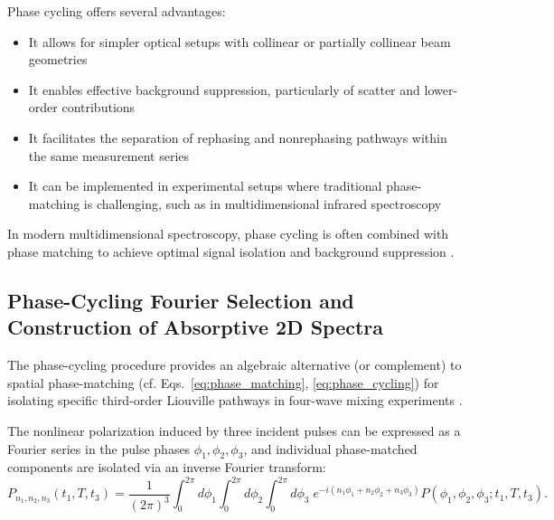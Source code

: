 \noindent Phase cycling offers several advantages:

\begin{itemize}
	\item It allows for simpler optical setups with collinear or partially collinear beam geometries
	\item It enables effective background suppression, particularly of scatter and lower-order contributions
	\item It facilitates the separation of rephasing and nonrephasing pathways within the same measurement series
	\item It can be implemented in experimental setups where traditional phase-matching is challenging, such as in multidimensional infrared spectroscopy
\end{itemize}

\noindent In modern multidimensional spectroscopy, phase cycling is often combined with phase matching to achieve optimal signal isolation and background suppression \cite{huang-fuetal2024developmentphasecyclinginterfacespecific, tianetal2003femtosecondphasecoherenttwodimensional}.

\subsection{Phase-Cycling Fourier Selection and Construction of Absorptive 2D Spectra}
\label{subsec:phase_cycling_fourier_selection}

\noindent The phase-cycling procedure provides an algebraic alternative (or complement) to spatial phase-matching (cf. Eqs.~\eqref{eq:phase_matching}, \eqref{eq:phase_cycling}) for isolating specific third-order Liouville pathways in four-wave mixing experiments \cite{mukamel1995principlesnonlinearoptical, cho2009twodimensionalopticalspectroscopy, jonas2003twodimensionalfemtosecondspectroscopy, brixneretal2004phasestabilizedtwodimensionalelectronic, greenetal2024vibrationalcoherenceshalfbroadband}.

\noindent The nonlinear polarization induced by three incident pulses can be expressed as a Fourier series in the pulse phases $\phi_1, \phi_2, \phi_3$, and individual phase-matched components are isolated via an inverse Fourier transform:
\begin{equation}
	P_{n_1,n_2,n_3}(t_1,T,t_3) =
	\frac{1}{(2\pi)^3} \int_{0}^{2\pi} \!\! d\phi_1
	\int_{0}^{2\pi} \!\! d\phi_2
	\int_{0}^{2\pi} \!\! d\phi_3 \;
	e^{-i(n_1\phi_1+n_2\phi_2+n_3\phi_3)}
	P(\phi_1,\phi_2,\phi_3;t_1,T,t_3).
	\label{eq:continuous_phase_cycling}
\end{equation}

